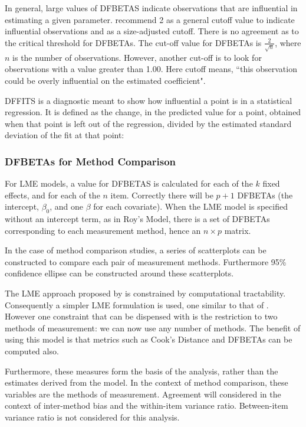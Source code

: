 \documentclass[12pt, a4paper]{report}
\theoremstyle{plain}
\theoremstyle{definition}
\theoremstyle{remark}
\begin{document}
 
	
In general, large values of DFBETAS indicate observations that are influential in estimating a given parameter. \citet{belsley2005} recommend 2 as a general cutoff value to indicate influential observations and as a size-adjusted cutoff. There is no agreement as to the critical threshold for DFBETAs. The cut-off value for DFBETAs is $\frac{2}{\sqrt{n}}$, where $n$ is the number of observations. However, another cut-off is to look for observations with a value greater than 1.00. Here cutoff means,
``this observation could be overly influential on the estimated coefficient".

 DFFITS is a diagnostic meant to show how influential a point is in a statistical regression. It is defined as the change, in the predicted value for a point, obtained when that point is left out of the regression, divided by the estimated standard deviation of the fit at that point:


	

	

	\subsubsection{DFBETAs for Method Comparison}
	
	For LME models, a value for DFBETAS is calculated for each of the $k$ fixed effects, and for each of the $n$ item. Correctly there will be $p+1$ DFBETAs (the intercept, $\beta_0$, and one $\beta$ for each covariate). When the LME model is specified without an intercept term, as in Roy's Model, there is a set of DFBETAs corresponding to each measurement method, hence an $n \times p$ matrix.
	
	In the case of method comparison studies, a series of scatterplots can be constructed to compare each pair of measurement methods.
	Furthermore 95\% confidence ellipse can be constructed around these scatterplots.
	
	
	
	The LME approach proposed by \citet{ARoy2009} is constrained by computational tractability.
	Consequently a simpler LME formulation is used, one similar to that of \citet{BXC2008}. However one constraint that can be dispensed with is the restriction to
	two methods of measurement: we can now use any number of methods.
	The benefit of using this model is that metrics such as Cook's Distance and DFBETAs can be computed also.

Furthermore, these measures form the basis of the analysis, rather than the estimates derived from the model. In the context of method comparison, these variables are the methods of measurement.
Agreement will considered in the context of inter-method bias and the within-item variance ratio. Between-item variance ratio is not considered for this analysis.
\end{document}
